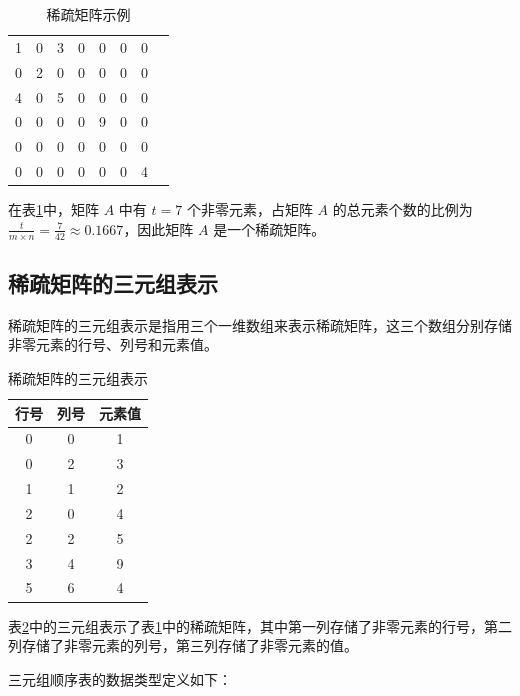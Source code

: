 \documentclass[lang=cn,newtx,10pt,scheme=chinese]{elegantbook}
\begin{document}
\begin{table}[htbp]
  \centering
  \caption{稀疏矩阵示例}
  \begin{tabular}{||ccccccc||c}
    
    1 & 0 & 3 & 0 & 0 & 0 & 0 \\
    0 & 2 & 0 & 0 & 0 & 0 & 0 \\
    4 & 0 & 5 & 0 & 0 & 0 & 0 \\
    0 & 0 & 0 & 0 & 9 & 0 & 0 \\
    0 & 0 & 0 & 0 & 0 & 0 & 0 \\
    0 & 0 & 0 & 0 & 0 & 0 & 4 \\
    
  \end{tabular}
  \label{table:sparse_matrix}
\end{table}

在表\ref{table:sparse_matrix}中，矩阵 $A$ 中有 $t = 7$ 个非零元素，占矩阵 $A$ 的总元素个数的比例为 $\frac{t}{m \times n} = \frac{7}{42} \approx 0.1667$，因此矩阵 $A$ 是一个稀疏矩阵。

\subsection{稀疏矩阵的三元组表示}

稀疏矩阵的三元组表示是指用三个一维数组来表示稀疏矩阵，这三个数组分别存储非零元素的行号、列号和元素值。


\begin{table}[htbp]
  \centering
  \caption{稀疏矩阵的三元组表示}
  \begin{tabular}{|c|c|c|}
    \hline
    行号 & 列号 & 元素值 \\
    \hline
    0 & 0 & 1 \\
    0 & 2 & 3 \\
    1 & 1 & 2 \\
    2 & 0 & 4 \\
    2 & 2 & 5 \\
    3 & 4 & 9 \\
    5 & 6 & 4 \\
    \hline
  \end{tabular}
  \label{table:sparse_matrix_triplet}
\end{table}

表\ref{table:sparse_matrix_triplet}中的三元组表示了表\ref{table:sparse_matrix}中的稀疏矩阵，其中第一列存储了非零元素的行号，第二列存储了非零元素的列号，第三列存储了非零元素的值。

三元组顺序表的数据类型定义如下：
\end{document}

